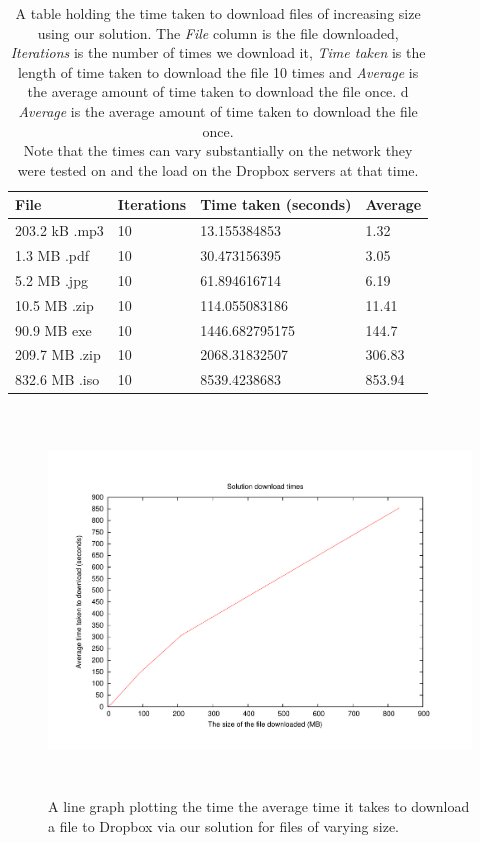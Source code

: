 \documentclass[12pt, titlepage]{article}
\begin{document}
\bigskip
\begin{table}[H]
\begin{center}
    \begin{tabular}{ | l | l | l | l |}
    \hline
    \textbf{File} & \textbf{Iterations} & \textbf{Time taken (seconds)} & \textbf{Average} \\ \hline
    203.2 kB .mp3 & 10 & 13.155384853 & 1.32 \\ \hline
    1.3 MB .pdf  & 10 & 30.473156395 & 3.05 \\ \hline
    5.2 MB .jpg & 10 & 61.894616714 & 6.19 \\ \hline
    10.5 MB .zip & 10 & 114.055083186 & 11.41 \\ \hline
    90.9 MB exe & 10 & 1446.682795175  & 144.7 \\ \hline
    209.7 MB .zip & 10 & 2068.31832507 & 306.83 \\ \hline
    832.6 MB .iso & 10 & 8539.4238683 & 853.94 \\ \hline
    \end{tabular}
    \caption{A table holding the time taken to download files of increasing size using our solution. The \textit{File} column is the file downloaded, \textit{Iterations} is the number of times we download it, \textit{Time taken} is the length of time taken to download the file 10 times and \textit{Average} is the average amount of time taken to download the file once. d \textit{Average} is the average amount of time taken to download the file once. \\ Note that the times can vary substantially on the network they were tested on and the load on the Dropbox servers at that time.} \label{tab:downloadBenchmark}
    \end{center}
    \end{table}
\bigskip

\begin{figure}[H]
\centerline{\includegraphics[height=4.0in,width=7in,angle=0]{plots/solutionDownload/solutionDownloadTimes.pdf}}
\caption{A line graph plotting the time the average time it takes to download a file to Dropbox via our solution for files of varying size.}
\label{fig:solutionDownloadLineGraph}
\end{figure}
\end{document}
